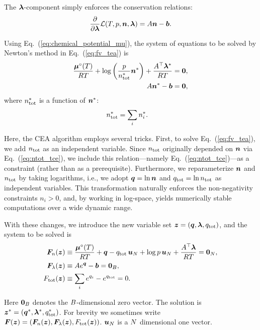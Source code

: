 The $\boldsymbol{\lambda}$-component simply enforces the conservation relations:
\begin{align}
\label{eq:Lpartiall}
\frac{\partial}{\partial \boldsymbol{\lambda}}  \mathcal{L}(T, p, \boldsymbol{n}, \boldsymbol{\lambda}) = A \boldsymbol{n} - \boldsymbol{b}.
\end{align}

Using Eq.~(\ref{eq:chemical_potential_mu}), the system of equations to be solved by Newton’s method in Eq.~(\ref{eq:fv_tea}) is
\begin{align}
\label{eq:Lpartialnx}
    \frac{\boldsymbol{\mu}^\circ(T)}{RT}+ \log{\left(\frac{p}{n_\mathrm{tot}^\ast} \boldsymbol{n}^\ast \right)} + \frac{A^\top \boldsymbol{\lambda}^\ast}{RT}   &= \boldsymbol{0}, \\
    A \boldsymbol{n}^\ast - \boldsymbol{b} &= \boldsymbol{0},
\end{align}
where $n_\mathrm{tot}^\ast$ is a function of $\boldsymbol{n}^\ast$:
\begin{align}
n_\mathrm{tot}^\ast &= \sum_i n_i^\ast.
\end{align}



Here, the CEA algorithm employs several tricks. First, to solve Eq.~(\ref{eq:fv_tea}), we add $n_\mathrm{tot}$ as an independent variable. Since $n_\mathrm{tot}$ originally depended on $\boldsymbol{n}$ via Eq.~(\ref{eq:ntot_tce}), we include this relation—namely Eq.~(\ref{eq:ntot_tce})—as a constraint (rather than as a prerequisite). Furthermore, we reparameterize $\boldsymbol{n}$ and $n_\mathrm{tot}$ by taking logarithms, i.e., we adopt $\boldsymbol{q} = \ln{\boldsymbol{n}}$ and $q_\mathrm{tot} = \ln{n_\mathrm{tot}}$ as independent variables. This transformation naturally enforces the non-negativity constraints $n_i > 0$, and, by working in log-space, yields numerically stable computations over a wide dynamic range. 

With these changes, we introduce the new variable set $\boldsymbol{z} = (\boldsymbol{q}, \boldsymbol{\lambda}, q_\mathrm{tot})$, and the system to be solved is
\begin{align}
\label{eq:Lpartialncea}
    \boldsymbol{F}_n (\boldsymbol{z}) &\equiv \frac{\boldsymbol{\mu}^\circ(T)}{RT} + \boldsymbol{q} - q_\mathrm{tot} \, \boldsymbol{u}_N + \log{p} \, \boldsymbol{u}_N  + \frac{A^\top \boldsymbol{\lambda}}{RT}= \boldsymbol{0}_N,  \\
    \boldsymbol{F}_\lambda (\boldsymbol{z}) &\equiv A e^{\boldsymbol{q}} - \boldsymbol{b} = \boldsymbol{0}_B, \\
    F_\mathrm{tot} (\boldsymbol{z}) &\equiv \sum_i {e^{q_i}} - e^{q_\mathrm{tot}} = 0.
\end{align}

Here $\boldsymbol{0}_B$ denotes the $B$-dimensional zero vector. The solution is $\boldsymbol{z}^\ast = (\boldsymbol{q}^\ast, \boldsymbol{\lambda}^\ast, q_\mathrm{tot}^\ast)$. For brevity we sometimes write $\boldsymbol{F} (\boldsymbol{z}) = (\boldsymbol{F}_n (\boldsymbol{z}), \boldsymbol{F}_\lambda (\boldsymbol{z}), F_\mathrm{tot} (\boldsymbol{z}))$. $\boldsymbol{u}_N$ is a $N$ dimensional one vector.

